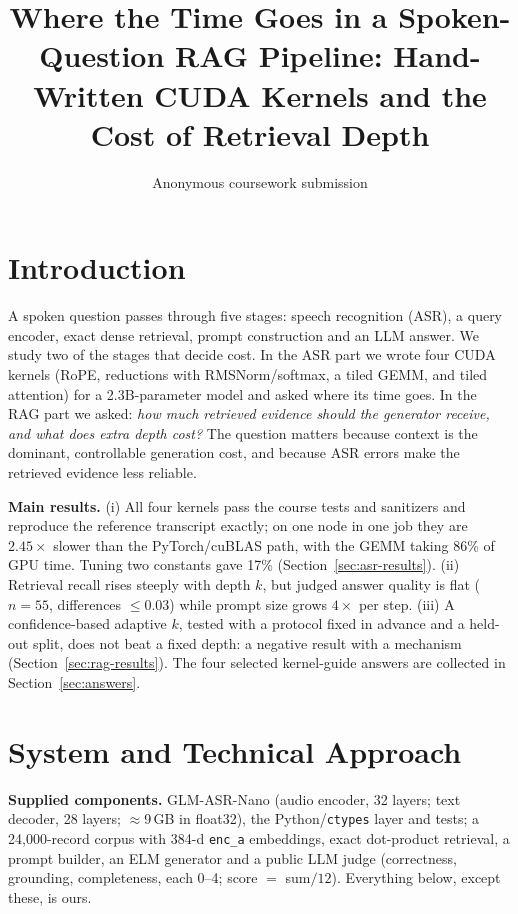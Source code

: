 \documentclass{article}
\title{Where the Time Goes in a Spoken-Question RAG Pipeline: Hand-Written CUDA Kernels and the Cost of Retrieval Depth}
\author{Anonymous coursework submission}
\begin{document}
\maketitle
{}

\section{Introduction}
\label{sec:introduction}
A spoken question passes through five stages: speech recognition (ASR), a query encoder, exact dense retrieval, prompt construction and an LLM answer. We study two of the stages that decide cost. In the ASR part we wrote four CUDA kernels (RoPE, reductions with RMSNorm/softmax, a tiled GEMM, and tiled attention) for a 2.3B-parameter model and asked where its time goes. In the RAG part we asked: \emph{how much retrieved evidence should the generator receive, and what does extra depth cost?} The question matters because context is the dominant, controllable generation cost, and because ASR errors make the retrieved evidence less reliable.

\textbf{Main results.} (i) All four kernels pass the course tests and sanitizers and reproduce the reference transcript exactly; on one node in one job they are $2.45\times$ slower than the PyTorch/cuBLAS path, with the GEMM taking 86\% of GPU time. Tuning two constants gave 17\% (Section~\ref{sec:asr-results}). (ii) Retrieval recall rises steeply with depth $k$, but judged answer quality is flat ($n{=}55$, differences $\le 0.03$) while prompt size grows $4\times$ per step. (iii) A confidence-based adaptive $k$, tested with a protocol fixed in advance and a held-out split, does not beat a fixed depth: a negative result with a mechanism (Section~\ref{sec:rag-results}). The four selected kernel-guide answers are collected in Section~\ref{sec:answers}.

\section{System and Technical Approach}
\label{sec:approach}
\textbf{Supplied components.} GLM-ASR-Nano (audio encoder, 32 layers; text decoder, 28 layers; $\approx$9\,GB in float32), the Python/\texttt{ctypes} layer and tests; a 24{,}000-record corpus with 384-d \texttt{enc\_a} embeddings, exact dot-product retrieval, a prompt builder, an ELM generator and a public LLM judge (correctness, grounding, completeness, each 0--4; score $=$ sum$/12$). Everything below, except these, is ours.
\end{document}
